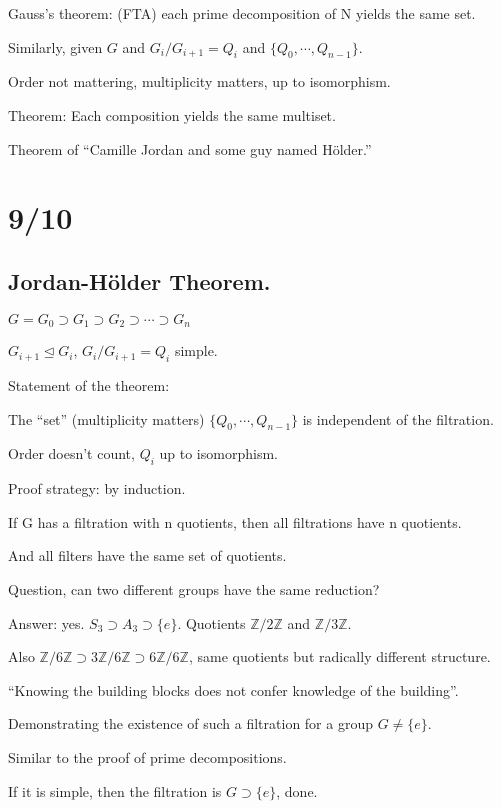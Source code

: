 \documentclass[12pt]{article}
\begin{document}
Gauss's theorem: (FTA) each prime decomposition of N yields the same set.

\noindent
Similarly, given $G$ and $G_i/G_{i+1} = Q_i$ and $\{Q_0,\cdots , Q_{n-1}\}$.

Order not mattering, multiplicity matters, up to isomorphism.

Theorem: Each composition yields the same multiset.

Theorem of ``Camille Jordan and some guy named H\"{o}lder.''

\section{9/10}

\subsection{Jordan-H\"{o}lder Theorem.}

$G = G_0 \supset G_1 \supset G_2 \supset \cdots \supset G_n$

$G_{i + 1} \trianglelefteq G_i$, $G_i/G_{i + 1} = Q_i$ simple.

\noindent
Statement of the theorem:

The ``set'' (multiplicity matters) $\{Q_0, \cdots, Q_{n - 1}\}$ is independent of the filtration.

Order doesn't count, $Q_i$ up to isomorphism.

\noindent
Proof strategy: by induction.

If G has a filtration with n quotients, then all filtrations have n quotients.

And all filters have the same set of quotients.

\noindent
Question, can two different groups have the same reduction?

Answer: yes.  $S_3 \supset A_3 \supset \{e\}.$ Quotients $\mathds{Z}/2\mathds{Z}$ and $\mathds{Z}/3\mathds{Z}$.

Also $\mathds{Z}/6\mathds{Z} \supset 3\mathds{Z}/6\mathds{Z} \supset 6\mathds{Z}/6\mathds{Z}$, same quotients but radically different structure.

``Knowing the building blocks does not confer knowledge of the building''.

\noindent
Demonstrating the existence of such a filtration for a group $G \neq \{e\}$.

Similar to the proof of prime decompositions.

If it is simple, then the filtration is $G \supset \{e\}$, done.
\end{document}
